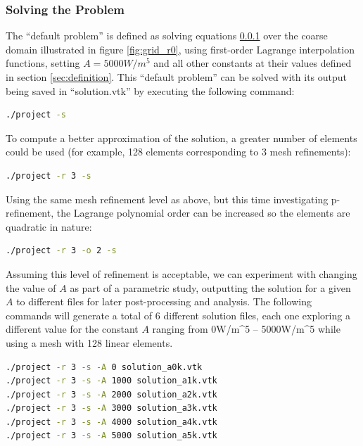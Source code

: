 \documentclass[letterpaper,10pt]{article}
\begin{document}
\subsubsection{Solving the Problem}
The ``default problem'' is defined as solving equations \ref{} over the coarse domain illustrated in figure \ref{fig:grid_r0}, using first-order Lagrange interpolation functions, setting $A=\unit{5000}{W/m^5}$ and all other constants at their values defined in section \ref{sec:definition}. This ``default problem'' can be solved with its output being saved in ``solution.vtk'' by executing the following command:
\vspace{-6mm}
\begin{lstlisting}[numbers=none,frame=none,language=bash]
./project -s
\end{lstlisting}
\vspace{1mm}

To compute a better approximation of the solution, a greater number of elements could be used (for example, 128 elements corresponding to 3 mesh refinements):
\vspace{-6mm}
\begin{lstlisting}[numbers=none,frame=none,language=bash]
./project -r 3 -s
\end{lstlisting}
\vspace{1mm}

Using the same mesh refinement level as above, but this time investigating p-refinement, the Lagrange polynomial order can be increased so the elements are quadratic in nature:
\vspace{-6mm}
\begin{lstlisting}[numbers=none,frame=none,language=bash]
./project -r 3 -o 2 -s
\end{lstlisting}
\vspace{1mm}

Assuming this level of refinement is acceptable, we can experiment with changing the value of $A$ as part of a parametric study, outputting the solution for a given $A$ to different files for later post-processing and analysis. The following commands will generate a total of 6 different solution files, each one exploring a different value for the constant $A$ ranging from \unit{0}{W/m^5} -- \unit{5000}{W/m^5} while using a mesh with 128 linear elements.
\vspace{-6mm}
\begin{lstlisting}[numbers=none,frame=none,language=bash]
./project -r 3 -s -A 0 solution_a0k.vtk
./project -r 3 -s -A 1000 solution_a1k.vtk
./project -r 3 -s -A 2000 solution_a2k.vtk
./project -r 3 -s -A 3000 solution_a3k.vtk
./project -r 3 -s -A 4000 solution_a4k.vtk
./project -r 3 -s -A 5000 solution_a5k.vtk
\end{lstlisting}
\vspace{1mm}
\end{document}
